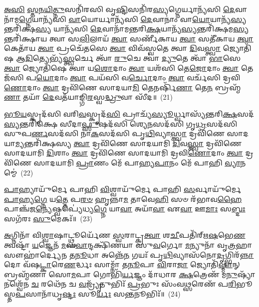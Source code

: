 \-\ul{𑌅}\-\-\ul{𑌸𑌿} \ul{𑌸𑍍𑌤}\-\-\ul{𑌨}\-\-\ul{𑌯𑌿}\-\-\ul{𑌤𑍍𑌨𑍁}\-𑌸𑌨𑌿᳴𑌰𑌸𑌿 𑌵𑍃\-\ul{𑌷𑍍𑌟𑌿}\-𑌸𑌨𑌿᳴𑌰\-\ul{𑌸𑍍𑌯}\-𑌗𑍍𑌨𑍇𑌰𑍍𑌯𑌾𑌨𑍍𑌯᳴𑌸𑌿 \ul{𑌦𑍇}\-𑌵𑌾𑌨𑌾᳴𑌮\-\ul{𑌗𑍍𑌨𑍇}\-𑌯𑌾𑌨𑍍𑌯᳴𑌸𑌿 \ul{𑌵𑌾}\-𑌯𑍋𑌰𑍍𑌯𑌾𑌨𑍍𑌯᳴𑌸𑌿 \ul{𑌦𑍇}\-𑌵𑌾𑌨𑌾𑌂॑ 𑌵𑌾\-\ul{𑌯𑍋}\-𑌯𑌾𑌨𑍍𑌯᳴\-\ul{𑌸𑍍𑌯}\-𑌨𑍍𑌤𑌰𑌿᳴𑌕𑍍𑌷\-\ul{𑌸𑍍𑌯} 𑌯𑌾𑌨𑍍𑌯᳴𑌸𑌿 \ul{𑌦𑍇}\-𑌵𑌾𑌨𑌾᳴𑌮𑌨𑍍𑌤𑌰𑌿\-\ul{𑌕𑍍𑌷}\-𑌯𑌾𑌨𑍍𑌯᳴\-\ul{𑌸𑍍𑌯}\-𑌨𑍍𑌤𑌰𑌿᳴𑌕𑍍𑌷𑌮\-\ul{𑌸𑍍𑌯}\-𑌨𑍍𑌤𑌰𑌿᳴𑌕𑍍𑌷𑌾𑌯 𑌤𑍍𑌵𑌾 𑌸\-\ul{𑌲𑌿}\-𑌲𑌾𑌯᳴ \ul{𑌤𑍍𑌵𑌾} 𑌸𑌰𑍍𑌣𑍀᳴𑌕𑌾𑌯 \ul{𑌤𑍍𑌵𑌾} 𑌸𑌤𑍀᳴𑌕𑌾𑌯 \ul{𑌤𑍍𑌵𑌾} 𑌕𑍇𑌤𑌾᳴𑌯 \ul{𑌤𑍍𑌵𑌾} 𑌪𑍍𑌰𑌚𑍇᳴𑌤𑌸𑍇 \ul{𑌤𑍍𑌵𑌾} 𑌵𑌿𑌵᳴𑌸𑍍𑌵𑌤𑍇 𑌤𑍍𑌵𑌾 \ul{𑌦𑌿}\-𑌵\-\ul{𑌸𑍍𑌤𑍍𑌵𑌾} 𑌜𑍍𑌯𑍋𑌤𑌿᳴𑌷 𑌆\-\ul{𑌦𑌿}\-𑌤𑍍𑌯𑍇𑌭𑍍𑌯᳴\-\ul{𑌸𑍍𑌤𑍍𑌵}\-𑌰𑍍𑌚𑍇 𑌤𑍍𑌵𑌾᳴ \ul{𑌰𑍁}\-𑌚𑍇 𑌤𑍍𑌵𑌾॑ \ul{𑌦𑍍𑌯𑍁}\-𑌤𑍇 𑌤𑍍𑌵𑌾᳴ \ul{𑌭𑌾}\-𑌸𑍇 \ul{𑌤𑍍𑌵𑌾} 𑌜𑍍𑌯𑍋𑌤𑌿᳴𑌷𑍇 𑌤𑍍𑌵𑌾 𑌯\-\ul{𑌶𑍋}\-𑌦𑌾𑌂 \ul{𑌤𑍍𑌵𑌾} 𑌯𑌶᳴𑌸𑌿 𑌤𑍇\-\ul{𑌜𑍋}\-𑌦𑌾𑌂 \ul{𑌤𑍍𑌵𑌾} 𑌤𑍇𑌜᳴𑌸𑌿 𑌪\-\ul{𑌯𑍋}\-𑌦𑌾𑌂 \ul{𑌤𑍍𑌵𑌾} 𑌪𑌯᳴𑌸𑌿 𑌵\-\ul{𑌰𑍍𑌚𑍋}\-𑌦𑌾𑌂 \ul{𑌤𑍍𑌵𑌾} 𑌵𑌰𑍍𑌚᳴𑌸𑌿 𑌦𑍍𑌰𑌵𑌿\-\ul{𑌣𑍋}\-𑌦𑌾𑌂 \ul{𑌤𑍍𑌵𑌾} 𑌦𑍍𑌰𑌵𑌿᳴𑌣𑍇 𑌸𑌾𑌦𑌯𑌾\-\ul{𑌮𑌿} 𑌤𑍇𑌨𑌰𑍍\mbox{}𑌷𑌿᳴\-\ul{𑌣𑌾} 𑌤𑍇\-\ul{𑌨} 𑌬𑍍𑌰𑌹𑍍𑌮᳴\-\ul{𑌣𑌾} 𑌤𑌯𑌾᳴ \ul{𑌦𑍇}\-𑌵𑌤᳴𑌯𑌾𑌙𑍍𑌗𑌿\-\ul{𑌰}\-𑌸𑍍𑌵\-\ul{𑌦𑍍𑌧𑍍𑌰𑍁}\-𑌵𑌾 𑌸𑍀᳴𑌦॥~(21)

{\anuvakamend[{\-\ul{𑌵𑌿}\-\-\ul{𑌦𑍍𑌯𑍁}\-𑌥𑍍𑌸𑌨𑌿᳴\-\ul{𑌰𑍍𑌦𑍍𑌯𑍁}\-𑌤𑍍𑌵𑍈\-\ul{𑌕𑌾}\-𑌨𑍍𑌨\-\ul{𑌤𑍍𑌰𑌿}\-\-\ul{𑍞}\-𑌶𑌚𑍍𑌚᳴}]}%

\-\ul{𑌭𑍂}\-\-\ul{𑌯}\-𑌸𑍍𑌕𑍃𑌦᳴𑌸𑌿 𑌵𑌰𑌿\-\ul{𑌵}\-𑌸𑍍𑌕𑍃𑌦᳴\-\ul{𑌸𑌿} 𑌪𑍍𑌰𑌾𑌚𑍍𑌯᳴\-\ul{𑌸𑍍𑌯𑍂}\-𑌰𑍍𑌧𑍍𑌵𑌾𑌸𑍍𑌯᳴𑌨𑍍𑌤𑌰𑌿\-\ul{𑌕𑍍𑌷}\-𑌸𑌦᳴\-\ul{𑌸𑍍𑌯}\-𑌨𑍍𑌤𑌰𑌿᳴𑌕𑍍𑌷𑍇 𑌸𑍀𑌦𑌾\-\ul{𑌫𑍍𑌸𑍁}\-𑌷𑌦᳴𑌸𑌿 𑌶𑍍𑌯𑍇\-\ul{𑌨}\-𑌸𑌦᳴𑌸𑌿 𑌗𑍃\-\ul{𑌧𑍍𑌰}\-𑌸𑌦᳴𑌸𑌿 𑌸𑍁𑌪\-\ul{𑌰𑍍𑌣}\-𑌸𑌦᳴𑌸𑌿 𑌨𑌾\-\ul{𑌕}\-𑌸𑌦᳴𑌸𑌿 𑌪𑍃\-\ul{𑌥𑌿}\-𑌵𑍍𑌯𑌾\-\ul{𑌸𑍍𑌤𑍍𑌵𑌾} 𑌦𑍍𑌰𑌵𑌿᳴𑌣𑍇 𑌸𑌾𑌦𑌯𑌾\-\ul{𑌮𑍍𑌯}\-𑌨𑍍𑌤𑌰𑌿᳴𑌕𑍍𑌷𑌸𑍍𑌯 \ul{𑌤𑍍𑌵𑌾} 𑌦𑍍𑌰𑌵𑌿᳴𑌣𑍇 𑌸𑌾𑌦𑌯𑌾𑌮𑌿 \ul{𑌦𑌿}\-𑌵\-\ul{𑌸𑍍𑌤𑍍𑌵𑌾} 𑌦𑍍𑌰𑌵𑌿᳴𑌣𑍇 𑌸𑌾𑌦𑌯𑌾𑌮𑌿 \ul{𑌦𑌿}\-𑌶𑌾𑌂 \ul{𑌤𑍍𑌵𑌾} 𑌦𑍍𑌰𑌵𑌿᳴𑌣𑍇 𑌸𑌾𑌦𑌯𑌾𑌮𑌿 𑌦𑍍𑌰𑌵𑌿\-\ul{𑌣𑍋}\-𑌦𑌾𑌂 \ul{𑌤𑍍𑌵𑌾} 𑌦𑍍𑌰𑌵𑌿᳴𑌣𑍇 𑌸𑌾𑌦𑌯𑌾𑌮𑌿 \ul{𑌪𑍍𑌰𑌾}\-𑌣𑌂 𑌮𑍇᳴ 𑌪𑌾𑌹𑍍𑌯\-\ul{𑌪𑌾}\-𑌨𑌂 𑌮𑍇᳴ 𑌪𑌾𑌹𑌿 \ul{𑌵𑍍𑌯𑌾}\-𑌨𑌮𑍍𑌮𑍇॑~(22)

\-\ul{𑌪𑌾}\-𑌹𑍍𑌯𑌾𑌯𑍁᳴𑌰𑍍𑌮𑍇 𑌪𑌾𑌹𑌿 \ul{𑌵𑌿}\-𑌶𑍍𑌵𑌾𑌯𑍁᳴𑌰𑍍𑌮𑍇 𑌪𑌾𑌹𑌿 \ul{𑌸}\-𑌰𑍍𑌵𑌾𑌯𑍁᳴𑌰𑍍𑌮𑍇 \ul{𑌪𑌾}\-𑌹𑍍𑌯\-\ul{𑌗𑍍𑌨𑍇} 𑌯\-\ul{𑌤𑍍𑌤𑍇} 𑌪\-\ul{𑌰}\-\-\ul{𑍞} 𑌹𑍃𑌨𑍍𑌨𑌾\-\ul{𑌮} 𑌤𑌾𑌵𑍇\-\ul{𑌹𑌿} 𑌸𑍞 𑌰᳴𑌭𑌾𑌵\-\ul{𑌹𑍈} 𑌪𑌾𑌞𑍍𑌚᳴𑌜\-\ul{𑌨𑍍𑌯𑍇}\-𑌷𑍍𑌵𑌪𑍍𑌯𑍇॑𑌧𑍍𑌯\-\ul{𑌗𑍍𑌨𑍇} 𑌯𑌾\-\ul{𑌵𑌾} 𑌅𑌯𑌾᳴\-\ul{𑌵𑌾} 𑌏\-\ul{𑌵𑌾} 𑌊\-\ul{𑌮𑌾𑌃} 𑌸\-\ul{𑌬𑍍𑌦𑌃} 𑌸𑌗᳴𑌰𑌃 \ul{𑌸𑍁}\-𑌮𑍇𑌕𑌃᳴॥~(23)

{\anuvakamend[{\-\ul{𑌵𑍍𑌯𑌾}\-𑌨\-\ul{𑌮𑍍𑌮𑍇} 𑌦𑍍𑌵𑌾𑌤𑍍𑌰𑌿𑍞᳴𑌶𑌚𑍍𑌚}]}%

\-\ul{𑌅}\-𑌗𑍍𑌨𑌿𑌨𑌾᳴ 𑌵𑌿\-\ul{𑌶𑍍𑌵𑌾}\-𑌷𑌾𑌟𑍍𑌥𑍍𑌸𑍂𑌰𑍍𑌯𑍇᳴𑌣 \ul{𑌸𑍍𑌵}\-𑌰𑌾𑌟𑍍𑌕𑍍𑌰\-\ul{𑌤𑍍𑌵𑌾} 𑌶\-\ul{𑌚𑍀}\-𑌪𑌤𑌿᳴𑌰𑍍\mbox{}𑌋\-\ul{𑌷}\-𑌭𑍇\-\ul{𑌣} 𑌤𑍍𑌵𑌷𑍍𑌟𑌾᳴ \ul{𑌯}\-𑌜𑍍𑌞𑍇𑌨᳴ \ul{𑌮}\-𑌘\-\ul{𑌵𑌾}\-𑌨𑍍𑌦𑌕𑍍𑌷𑌿᳴𑌣𑌯𑌾 𑌸𑍁\-\ul{𑌵}\-𑌰𑍍𑌗𑍋 \ul{𑌮}\-𑌨𑍍𑌯𑍁𑌨𑌾᳴ 𑌵𑍃\-\ul{𑌤𑍍𑌰}\-𑌹𑌾 𑌸𑍗𑌹𑌾॑𑌰𑍍𑌦𑍍𑌯𑍇𑌨 𑌤\-\ul{𑌨𑍂}\-𑌧𑌾 𑌅𑌨𑍍𑌨𑍇᳴\-\ul{𑌨} 𑌗𑌯𑌃᳴ 𑌪𑍃\-\ul{𑌥𑌿}\-𑌵𑍍𑌯𑌾𑌸᳴𑌨𑍋\-\ul{𑌦𑍃}\-𑌗𑍍𑌭𑌿𑌰᳴\-\ul{𑌨𑍍𑌨𑌾}\-𑌦𑍋 𑌵᳴𑌷\-\ul{𑌟𑍍𑌕𑌾}\-𑌰𑍇\-\ul{𑌣}\-𑌰𑍍𑌦𑍍𑌧𑌃 𑌸𑌾𑌮𑍍𑌨𑌾᳴ 𑌤\-\ul{𑌨𑍂}\-𑌪𑌾 \ul{𑌵𑌿}\-𑌰𑌾\-\ul{𑌜𑌾} 𑌜𑍍𑌯𑍋𑌤𑌿᳴\-\ul{𑌷𑍍𑌮𑌾}\-𑌨𑍍 𑌬𑍍𑌰𑌹𑍍𑌮᳴𑌣𑌾 𑌸𑍋\-\ul{𑌮}\-𑌪𑌾 𑌗𑍋𑌭𑌿᳴\-\ul{𑌰𑍍𑌯}\-𑌜𑍍𑌞𑌂 𑌦𑌾᳴𑌧𑌾𑌰 \ul{𑌕𑍍𑌷}\-𑌤𑍍𑌰𑍇𑌣᳴ 𑌮\-\ul{𑌨𑍁}\-𑌷𑍍𑌯𑌾᳴𑌨𑌶𑍍𑌵𑍇᳴𑌨 \ul{𑌚} 𑌰𑌥𑍇᳴𑌨 𑌚 \ul{𑌵}\-𑌜𑍍𑌰𑍍𑌯𑍃᳴𑌤𑍁𑌭𑌿𑌃᳴ \ul{𑌪𑍍𑌰}\-𑌭𑍁𑌃 𑌸𑌂᳴𑌵\-\ul{𑌥𑍍𑌸}\-𑌰𑍇𑌣᳴ 𑌪\-\ul{𑌰𑌿}\-𑌭𑍂𑌸𑍍𑌤\-\ul{𑌪}\-𑌸𑌾𑌨𑌾᳴𑌧𑍃\-\ul{𑌷𑍍𑌟𑌃} 𑌸𑍂\-\ul{𑌰𑍍𑌯𑌃} 𑌸\-\ul{𑌨𑍍𑌤}\-𑌨𑍂𑌭𑌿𑌃᳴॥~(24)

